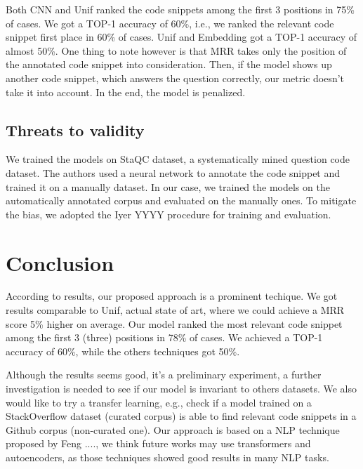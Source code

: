 \documentclass[sigconf]{acmart}
\begin{document}
Both CNN and Unif ranked the code snippets among the first 3 positions in 75\% of cases. We got a TOP-1 accuracy of 60\%, i.e., we ranked the relevant code snippet first place in 60\% of cases. Unif and Embedding got a TOP-1 accuracy of almost 50\%. One thing to note however is that MRR takes only the position of the annotated code snippet into consideration. Then, if the model shows up another code snippet, which answers the question correctly, our metric doesn't take it into account. In the end, the model is penalized. 

\subsection{Threats to validity}

We trained the models on StaQC dataset, a systematically mined question code dataset. The authors used a neural network to annotate the code snippet and trained it on a manually dataset. In our case, we trained the models on the automatically annotated corpus and evaluated on the manually ones. To mitigate the bias, we adopted the Iyer YYYY procedure for training and evaluation.

\section{Conclusion}

According to results, our proposed approach is a prominent techique. We got results comparable to Unif, actual state of art, where we could achieve a MRR score 5\% higher on average. Our model ranked the most relevant code snippet among the first 3 (three) positions in 78\% of cases. We achieved a TOP-1 accuracy of 60\%, while the others techniques got 50\%. 

Although the results seems good, it's a preliminary experiment, a further investigation is needed to see if our model is invariant to others datasets. We also would like to try a transfer learning, e.g., check if a model trained on a StackOverflow dataset (curated corpus) is able to find relevant code snippets in a Github corpus (non-curated one). Our approach is based on a NLP technique proposed by Feng ...., we think future works may use transformers and autoencoders, as those techniques showed good results in many NLP tasks. 




\end{document}
